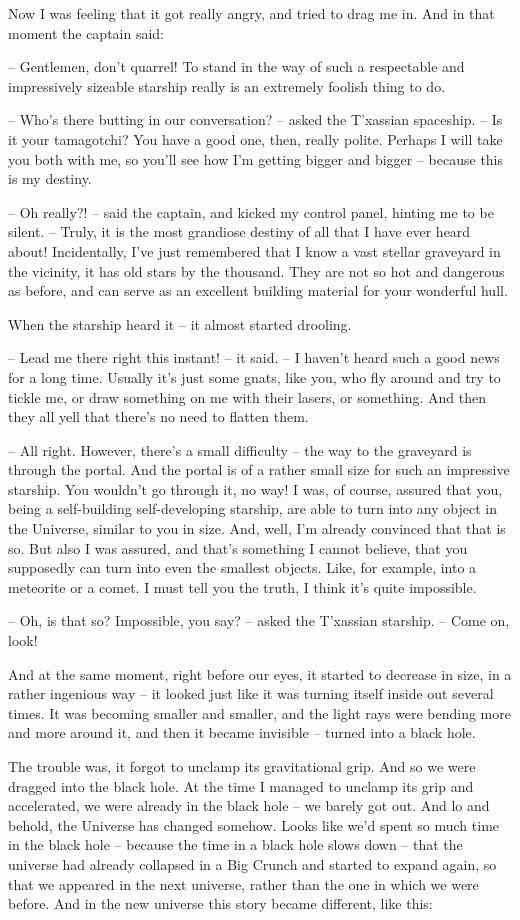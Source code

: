 \documentclass[ebook,twoside,final,openright]{memoir}
\begin{document}
Now I was feeling that it got really angry, and tried to drag me in. And in that moment the captain said:\par
– Gentlemen, don’t quarrel! To stand in the way of such a respectable and impressively sizeable starship really is an extremely foolish thing to do.\par
– Who’s there butting in our conversation? – asked the T'xassian spaceship. – Is it your tamagotchi? You have a good one, then, really polite. Perhaps I will take you both with me, so you’ll see how I’m getting bigger and bigger – because this is my destiny.\par
– Oh really?! – said the captain, and kicked my control panel, hinting me to be silent. – Truly, it is the most grandiose destiny of all that I have ever heard about! Incidentally, I’ve just remembered that I know a vast stellar graveyard in the vicinity, it has old stars by the thousand. They are not so hot and dangerous as before, and can serve as an excellent building material for your wonderful hull.\par
When the starship heard it – it almost started drooling.\par
– Lead me there right this instant! – it said. – I haven’t heard such a good news for a long time. Usually it’s just some gnats, like you, who fly around and try to tickle me, or draw something on me with their lasers, or something. And then they all yell that there’s no need to flatten them.\par
– All right. However, there’s a small difficulty – the way to the graveyard is through the portal. And the portal is of a rather small size for such an impressive starship. You wouldn’t go through it, no way! I was, of course, assured that you, being a self-building self-developing starship, are able to turn into any object in the Universe, similar to you in size. And, well, I’m already convinced that that is so. But also I was assured, and that’s something I cannot believe, that you supposedly can turn into even the smallest objects. Like, for example, into a meteorite or a comet. I must tell you the truth, I think it’s quite impossible.\par
– Oh, is that so? Impossible, you say? – asked the T'xassian starship. – Come on, look!\par
\par
And at the same moment, right before our eyes, it started to decrease in size, in a rather ingenious way – it looked just like it was turning itself inside out several times. It was becoming smaller and smaller, and the light rays were bending more and more around it, and then it became invisible – turned into a black hole.\par
The trouble was, it forgot to unclamp its gravitational grip. And so we were dragged into the black hole. At the time I managed to unclamp its grip and accelerated, we were already in the black hole – we barely got out. And lo and behold, the Universe has changed somehow. Looks like we’d spent so much time in the black hole – because the time in a black hole slows down – that the universe had already collapsed in a Big Crunch and started to expand again, so that we appeared in the next universe, rather than the one in which we were before. And in the new universe this story became different, like this:
\end{document}
